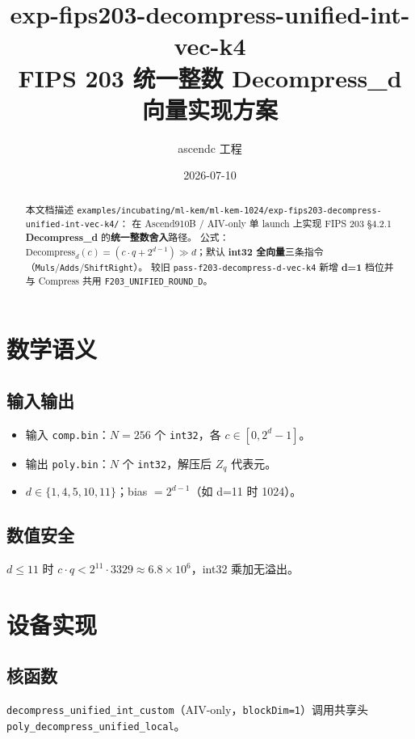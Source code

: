 \documentclass[UTF8,a4paper,11pt]{ctexart}
\title{exp-fips203-decompress-unified-int-vec-k4\\FIPS 203 统一整数 Decompress\_d 向量实现方案}
\author{ascendc 工程}
\date{2026-07-10}
\begin{document}
\maketitle

\begin{abstract}
本文档描述 \texttt{examples/incubating/ml-kem/ml-kem-1024/exp-fips203-decompress-unified-int-vec-k4/}：
在 Ascend910B / AIV-only 单 launch 上实现 FIPS 203 §4.2.1 \textbf{Decompress\_d} 的\textbf{统一整数舍入}路径。
公式：$\text{Decompress}_d(c)=(c\cdot q+2^{d-1})\gg d$；默认 \textbf{int32 全向量}三条指令（\texttt{Muls}/\texttt{Adds}/\texttt{ShiftRight}）。
较旧 \texttt{pass-f203-decompress-d-vec-k4} 新增 \textbf{d=1} 档位并与 Compress 共用 \texttt{F203\_UNIFIED\_ROUND\_D}。
\end{abstract}

\section{数学语义}

\subsection{输入输出}
\begin{itemize}
  \item 输入 \texttt{comp.bin}：$N=256$ 个 \texttt{int32}，各 $c\in[0,2^d-1]$。
  \item 输出 \texttt{poly.bin}：$N$ 个 \texttt{int32}，解压后 $Z_q$ 代表元。
  \item $d\in\{1,4,5,10,11\}$；bias $=2^{d-1}$（如 d=11 时 1024）。
\end{itemize}

\subsection{数值安全}
$d\le 11$ 时 $c\cdot q < 2^{11}\cdot 3329 \approx 6.8\times 10^6$，int32 乘加无溢出。

\section{设备实现}

\subsection{核函数}
\texttt{decompress\_unified\_int\_custom}（AIV-only，\texttt{blockDim=1}）调用共享头
\texttt{poly\_decompress\_unified\_local}。
\end{document}
